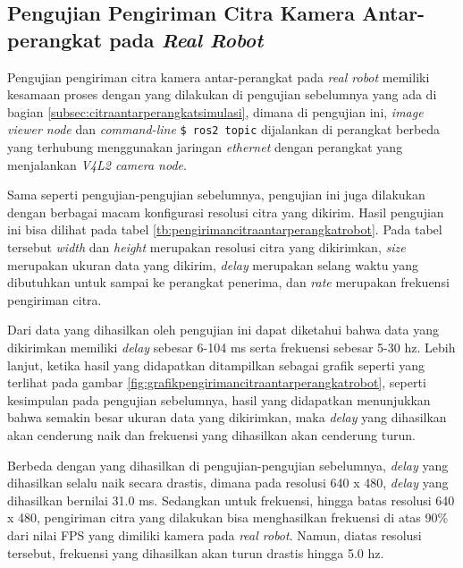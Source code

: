 \subsection{Pengujian Pengiriman Citra Kamera Antar-perangkat pada \emph{Real Robot}}
\label{subsec:citraantarperangkatrobot}

Pengujian pengiriman citra kamera antar-perangkat pada \emph{real robot} memiliki kesamaan proses dengan yang dilakukan di pengujian sebelumnya yang ada di bagian \ref{subsec:citraantarperangkatsimulasi},
  dimana di pengujian ini, \emph{image viewer node} dan \emph{command-line} \lstinline{$ ros2 topic} dijalankan di perangkat berbeda yang terhubung menggunakan jaringan \emph{ethernet} dengan perangkat yang menjalankan \emph{V4L2 camera node}.



Sama seperti pengujian-pengujian sebelumnya,
  pengujian ini juga dilakukan dengan berbagai macam konfigurasi resolusi citra yang dikirim.
Hasil pengujian ini bisa dilihat pada tabel \ref{tb:pengirimancitraantarperangkatrobot}.
Pada tabel tersebut \emph{width} dan \emph{height} merupakan resolusi citra yang dikirimkan,
  \emph{size} merupakan ukuran data yang dikirim,
  \emph{delay} merupakan selang waktu yang dibutuhkan untuk sampai ke perangkat penerima,
  dan \emph{rate} merupakan frekuensi pengiriman citra.



Dari data yang dihasilkan oleh pengujian ini dapat diketahui bahwa data yang dikirimkan memiliki \emph{delay} sebesar 6-104 ms serta frekuensi sebesar 5-30 hz.
Lebih lanjut, ketika hasil yang didapatkan ditampilkan sebagai grafik seperti yang terlihat pada gambar \ref{fig:grafikpengirimancitraantarperangkatrobot},
  seperti kesimpulan pada pengujian sebelumnya,
  hasil yang didapatkan menunjukkan bahwa semakin besar ukuran data yang dikirimkan,
  maka \emph{delay} yang dihasilkan akan cenderung naik dan frekuensi yang dihasilkan akan cenderung turun.

Berbeda dengan yang dihasilkan di pengujian-pengujian sebelumnya,
  \emph{delay} yang dihasilkan selalu naik secara drastis,
  dimana pada resolusi 640 x 480, \emph{delay} yang dihasilkan bernilai 31.0 ms.
Sedangkan untuk frekuensi, hingga batas resolusi 640 x 480,
  pengiriman citra yang dilakukan bisa menghasilkan frekuensi di atas 90\% dari nilai FPS yang dimiliki kamera pada \emph{real robot}.
Namun, diatas resolusi tersebut, frekuensi yang dihasilkan akan turun drastis hingga 5.0 hz.
